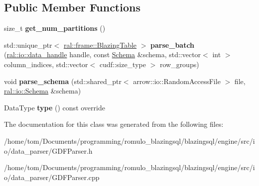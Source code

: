 \subsection*{Public Member Functions}
\begin{DoxyCompactItemize}
\item 
\mbox{\label{classral_1_1io_1_1gdf__parser_a3bddac0fcbb1b75ca1bfc6f6caefa793}} 
size\+\_\+t {\bfseries get\+\_\+num\+\_\+partitions} ()
\item 
\mbox{\label{classral_1_1io_1_1gdf__parser_af52d94871db8f8b1fee81f304a83acbf}} 
std\+::unique\+\_\+ptr$<$ \hyperlink{classral_1_1frame_1_1BlazingTable}{ral\+::frame\+::\+Blazing\+Table} $>$ {\bfseries parse\+\_\+batch} (\hyperlink{structral_1_1io_1_1data__handle}{ral\+::io\+::data\+\_\+handle} handle, const \hyperlink{classral_1_1io_1_1Schema}{Schema} \&schema, std\+::vector$<$ int $>$ column\+\_\+indices, std\+::vector$<$ cudf\+::size\+\_\+type $>$ row\+\_\+groups)
\item 
\mbox{\label{classral_1_1io_1_1gdf__parser_af0b1fc1badf60726c2bf1d04ef0296b7}} 
void {\bfseries parse\+\_\+schema} (std\+::shared\+\_\+ptr$<$ arrow\+::io\+::\+Random\+Access\+File $>$ file, \hyperlink{classral_1_1io_1_1Schema}{ral\+::io\+::\+Schema} \&schema)
\item 
\mbox{\label{classral_1_1io_1_1gdf__parser_a3742f063139b4a48c62e396d7f843855}} 
Data\+Type {\bfseries type} () const override
\end{DoxyCompactItemize}


The documentation for this class was generated from the following files\+:\begin{DoxyCompactItemize}
\item 
/home/tom/\+Documents/programming/romulo\+\_\+blazingsql/blazingsql/engine/src/io/data\+\_\+parser/G\+D\+F\+Parser.\+h\item 
/home/tom/\+Documents/programming/romulo\+\_\+blazingsql/blazingsql/engine/src/io/data\+\_\+parser/G\+D\+F\+Parser.\+cpp\end{DoxyCompactItemize}
